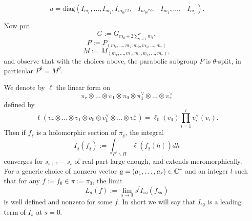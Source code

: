 \documentclass[11pt,letterpaper]{amsart}
\def\diag{\mathrm{diag}}
\theoremstyle{plain}
\numberwithin{equation}{section}
\begin{document}
\begin{enumerate}[1)]
\begin{enumerate}
		\[u=\diag(I_{m_r},\dots,I_{m_1},I_{m_0/2},-I_{m_0/2},-I_{m_1},\dots,-I_{m_r}). \]
\end{enumerate}
\end{enumerate}


Now put \[G:=G_{m_0+2\sum_{i=1}^r m_i},\] 
\[P:=P_{(m_r,\dots, m_1,m_0,m_1,\dots,m_r)}\]  
\[M:=M_{(m_r,\dots, m_1,m_0,m_1,\dots,m_r)},\] and observe that with the choices above, the parabolic subgroup $P$ 
is $\theta$-split, in particular $P^\theta=M^\theta$. 

We denote by $\ell$ the linear form on \[\pi_r \otimes \dots \otimes \pi_1 \otimes \pi_0\otimes  \pi_1^\vee  \otimes \dots \otimes  \pi_r^\vee  \] defined by 
\[\ell(v_r\otimes \dots \otimes v_1 \otimes  v_0 \otimes v_1^\vee \otimes \dots\otimes v_r^\vee )
=\ell_0(v_0)\prod_{i=1}^r v_i^\vee(v_i).\] 
Then if $f_{\underline{s}}$ is a holomorphic section of $\pi_{\underline{s}}$, the integral 
\[I_{{\underline{s}}}(f_{\underline{s}}):=\int_{P^{\theta}\backslash H} \ell(f_{\underline{s}}(h))dh\] converges for $s_{i+1}-s_i$ of real part 
large enough, and extends meromorphically. For a generic choice of nonzero vector $\underline{a}=(a_1,\dots,a_r)\in {\mathbb {C}}^r$ and an integer $l$ such that for any $f:=f_0\in \pi:=\pi_0$, the limit 
\[L_{\underline{a}}(f):=\lim_{s\rightarrow 0} s^l I_{s\underline{a}}(f_{s\underline{a}})\] is well defined and nonzero for some $f$. In short we will say that 
$L_{\underline{a}}$ is a leading term of $I_{\underline{s}}$ at $s=0$.
\end{document}
